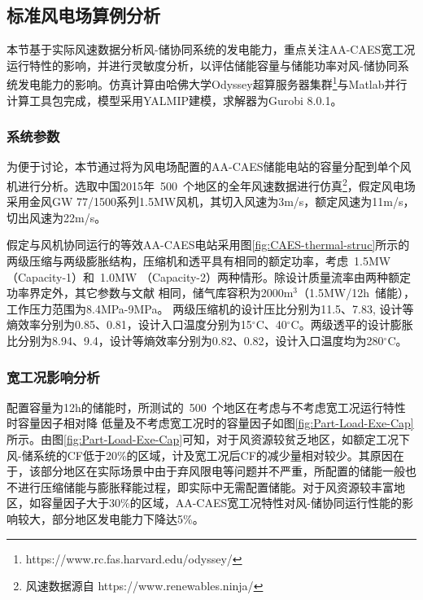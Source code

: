 \subsection{标准风电场算例分析}

本节基于实际风速数据分析风-储协同系统的发电能力，重点关注AA-CAES宽工况运行特性的影响，并进行灵敏度分析，以评估储能容量与储能功率对风-储协同系统发电能力的影响。仿真计算由哈佛大学Odyssey超算服务器集群\footnote{https://www.rc.fas.harvard.edu/odyssey/}与Matlab并行计算工具包完成，模型采用YALMIP\cite{YALMIP}建模，求解器为Gurobi 8.0.1。

\subsubsection{系统参数}
为便于讨论，本节通过将为风电场配置的AA-CAES储能电站的容量分配到单个风机进行分析。选取中国2015年~500~个地区的全年风速数据进行仿真\footnote{风速数据源自 https://www.renewables.ninja/}，假定风电场采用金风GW 77/1500系列1.5MW风机，其切入风速为3m/s，额定风速为11m/s， 切出风速为22m/s。

假定与风机协同运行的等效AA-CAES电站采用图\ref{fig:CAES-thermal-struc}所示的两级压缩与两级膨胀结构，压缩机和透平具有相同的额定功率，考虑~1.5MW（Capacity-1）和~1.0MW （Capacity-2）两种情形。除设计质量流率由两种额定功率界定外，其它参数与文献 相同，储气库容积为2000m$^3$（1.5MW/12h~储能），工作压力范围为8.4MPa-9MPa。 两级压缩机的设计压比分别为11.5、7.83, 设计等熵效率分别为0.85、0.81，设计入口温度分别为15$^\circ$C、40$^\circ$C。两级透平的设计膨胀比分别为8.94、9.4，设计等熵效率分别为0.82、0.82，设计入口温度均为280$^\circ$C。


\subsubsection{宽工况影响分析}
配置容量为12h的储能时，所测试的~500~个地区在考虑与不考虑宽工况运行特性时容量因子相对降
低量及不考虑宽工况时的容量因子如图\ref{fig:Part-Load-Exe-Cap}所示。由图\ref{fig:Part-Load-Exe-Cap}可知，对于风资源较贫乏地区，如额定工况下风-储系统的CF低于20\%的区域，计及宽工况后CF的减少量相对较少。其原因在于，该部分地区在实际场景中由于弃风限电等问题并不严重，所配置的储能一般也不进行压缩储能与膨胀释能过程，即实际中无需配置储能。对于风资源较丰富地区，如容量因子大于30\%的区域，AA-CAES宽工况特性对风-储协同运行性能的影响较大，部分地区发电能力下降达5\%。

